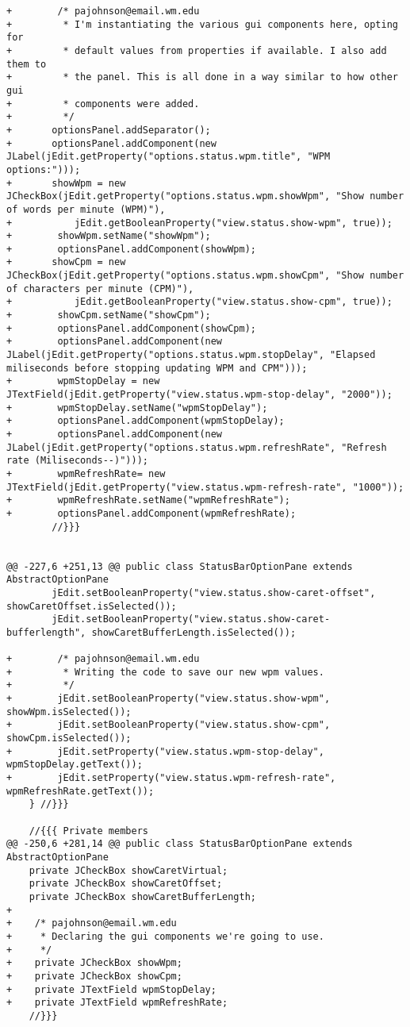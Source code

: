 \documentclass[12pt]{article}
\begin{document}
\begin{verbatim}
+        /* pajohnson@email.wm.edu
+         * I'm instantiating the various gui components here, opting for
+         * default values from properties if available. I also add them to
+         * the panel. This is all done in a way similar to how other gui
+         * components were added.
+         */
+		optionsPanel.addSeparator();
+		optionsPanel.addComponent(new JLabel(jEdit.getProperty("options.status.wpm.title", "WPM options:")));
+		showWpm = new JCheckBox(jEdit.getProperty("options.status.wpm.showWpm", "Show number of words per minute (WPM)"),
+			jEdit.getBooleanProperty("view.status.show-wpm", true));
+        showWpm.setName("showWpm");
+        optionsPanel.addComponent(showWpm);
+		showCpm = new JCheckBox(jEdit.getProperty("options.status.wpm.showCpm", "Show number of characters per minute (CPM)"),
+			jEdit.getBooleanProperty("view.status.show-cpm", true));
+        showCpm.setName("showCpm");
+        optionsPanel.addComponent(showCpm);
+        optionsPanel.addComponent(new JLabel(jEdit.getProperty("options.status.wpm.stopDelay", "Elapsed miliseconds before stopping updating WPM and CPM")));
+        wpmStopDelay = new JTextField(jEdit.getProperty("view.status.wpm-stop-delay", "2000"));
+        wpmStopDelay.setName("wpmStopDelay");
+        optionsPanel.addComponent(wpmStopDelay);
+        optionsPanel.addComponent(new JLabel(jEdit.getProperty("options.status.wpm.refreshRate", "Refresh rate (Miliseconds--)")));
+        wpmRefreshRate= new JTextField(jEdit.getProperty("view.status.wpm-refresh-rate", "1000"));
+        wpmRefreshRate.setName("wpmRefreshRate");
+        optionsPanel.addComponent(wpmRefreshRate);
 		//}}}
 
 
@@ -227,6 +251,13 @@ public class StatusBarOptionPane extends AbstractOptionPane
 		jEdit.setBooleanProperty("view.status.show-caret-offset", showCaretOffset.isSelected());
 		jEdit.setBooleanProperty("view.status.show-caret-bufferlength", showCaretBufferLength.isSelected());
 
+        /* pajohnson@email.wm.edu
+         * Writing the code to save our new wpm values.
+         */
+        jEdit.setBooleanProperty("view.status.show-wpm", showWpm.isSelected());
+        jEdit.setBooleanProperty("view.status.show-cpm", showCpm.isSelected());
+        jEdit.setProperty("view.status.wpm-stop-delay", wpmStopDelay.getText());
+        jEdit.setProperty("view.status.wpm-refresh-rate", wpmRefreshRate.getText());
 	} //}}}
 
 	//{{{ Private members
@@ -250,6 +281,14 @@ public class StatusBarOptionPane extends AbstractOptionPane
 	private JCheckBox showCaretVirtual;
 	private JCheckBox showCaretOffset;
 	private JCheckBox showCaretBufferLength;
+
+    /* pajohnson@email.wm.edu
+     * Declaring the gui components we're going to use.
+     */
+    private JCheckBox showWpm;
+    private JCheckBox showCpm;
+    private JTextField wpmStopDelay;
+    private JTextField wpmRefreshRate;
 	//}}}
 

\end{verbatim}
\end{document}
